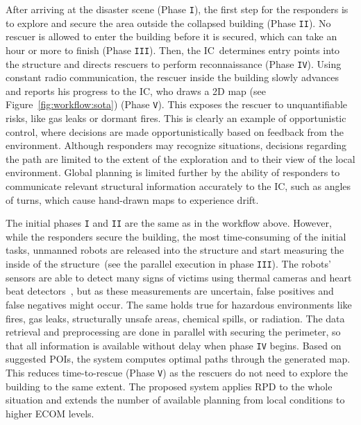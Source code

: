\documentclass{egpubl}
\def\IC{IC}
\begin{document}
 After arriving at the disaster scene (Phase \texttt{I}), the first step for the responders is to explore and secure the area outside the collapsed building (Phase \texttt{II}). No rescuer is allowed to enter the building before it is secured, which can take an hour or more to finish (Phase \texttt{III}). Then, the \IC\ determines entry points into the structure and directs rescuers to perform reconnaissance (Phase \texttt{IV}). Using constant radio communication, the rescuer inside the building slowly advances and reports his progress to the \IC, who draws a 2D map (see Figure~\ref{fig:workflow:sota}) (Phase \texttt{V}). This exposes the rescuer to unquantifiable risks, like gas leaks or dormant fires. This is clearly an example of opportunistic control, where decisions are made opportunistically based on feedback from the environment. Although responders may recognize situations, decisions regarding the path are limited to the extent of the exploration and to their view of the local environment. Global planning is limited further by the ability of responders to communicate relevant structural information accurately to the \IC, such as angles of turns, which cause hand-drawn maps to experience drift.

 The initial phases \texttt{I} and \texttt{II} are the same as in the workflow above. However, while the responders secure the building, the most time-consuming of the initial tasks, unmanned robots are released into the structure and start measuring the inside of the structure~(see the parallel execution in phase \texttt{III}). The robots' sensors are able to detect many signs of victims using thermal cameras and heart beat detectors~\cite{6027084, Wu12Eulerian}, but as these measurements are uncertain, false positives and false negatives might occur. The same holds true for hazardous environments like fires, gas leaks, structurally unsafe areas, chemical spills, or radiation. The data retrieval and preprocessing are done in parallel with securing the perimeter, so that all information is available without delay when phase \texttt{IV} begins. Based on suggested POIs, the system computes optimal paths through the generated map. This reduces time-to-rescue (Phase \texttt{V}) as the rescuers do not need to explore the building to the same extent. The proposed system applies RPD to the whole situation and extends the number of available planning from local conditions to higher ECOM levels.
\end{document}
